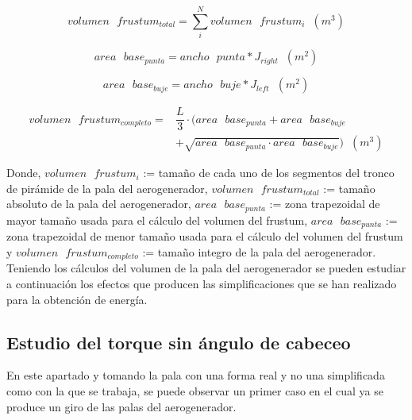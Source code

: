 \begin{equation}
 volumen \text{ } frustum_{total} = \sum_{i}^{N}volumen \text{ } frustum_i \hspace{7pt} (m^3)
\end{equation}

\begin{equation}
 area \text{ } base_{punta} = ancho \text{ } punta * J_{right} \hspace{7pt} (m^2)
 \end{equation}

 \begin{equation}
 area \text{ } base_{buje} = ancho \text{ } buje * J_{left} \hspace{7pt} (m^2)
 \end{equation}
 
 \begin{equation}
    \begin{split}
        volumen \text{ } frustum_{completo} = & \dfrac{L}{3} \cdot ( area \text{ } base_{punta} + area \text{ }  base_{buje}\\
        & + \sqrt{area \text{ } base_{punta} \cdot area \text{ } base_{buje}}) \hspace{7pt} (m^3) 
    \end{split}
 \end{equation}

Donde, $ volumen \text{ } frustum_i $ := tamaño de cada uno de los segmentos del tronco de pirámide de la pala del aerogenerador, $ volumen \text{ } frustum_{total} $ := tamaño absoluto de la pala del aerogenerador, $area \text{ } base_{punta}$ := zona trapezoidal de mayor tamaño usada para el cálculo del volumen del frustum, $area \text{ } base_{punta}$ := zona trapezoidal de menor tamaño usada para el cálculo del volumen del frustum y $ volumen \text{ } frustum_{completo} $ := tamaño integro de la pala del aerogenerador.\\


Teniendo los cálculos del volumen de la pala del aerogenerador se pueden estudiar a continuación los efectos que producen las simplificaciones que se han realizado para la obtención de energía.


\subsection{Estudio del torque sin ángulo de cabeceo}
\label{section:torque_pala_horizontal}
En este apartado y tomando la pala con una forma real y no una simplificada como con la que se trabaja, se puede observar un primer caso en el cual ya se produce un giro de las palas del aerogenerador. \\

